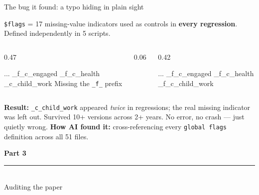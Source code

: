 \documentclass[aspectratio=169, 10pt]{beamer}
\begin{document}
\begin{frame}[fragile]{The bug it found: a typo hiding in plain sight}
\vskip-2pt
\begin{tcolorbox}[keybox, title={\faBug\quad The \texttt{\$flags} variable list}, top=2pt, bottom=2pt]
\small
\texttt{\$flags} = 17 missing-value indicators used as controls in \textbf{every regression}. Defined independently in 5 scripts.
\end{tcolorbox}
\vskip3pt
\begin{columns}[T]
\begin{column}{0.47\textwidth}
\begin{tcolorbox}[colback=SoftCoral!8, colframe=SoftCoral, boxrule=0.5pt, arc=2pt, left=5pt, right=5pt, top=3pt, bottom=3pt]
\vskip3pt
{\ttfamily\small\color{DeepCharcoal}
... \_f\_c\_engaged \_f\_c\_health\\
\colorbox{SoftCoral!20}{\_c\_child\_work}}
\vskip2pt
{\scriptsize Missing the \texttt{\_f\_} prefix}
\end{tcolorbox}
\end{column}
\begin{column}{0.06\textwidth}
\centering\vskip0.8cm
{\large\color{UVMGold}\faArrowRight}
\end{column}
\begin{column}{0.42\textwidth}
\begin{tcolorbox}[colback=PaleSage, colframe=SlateTeal!50, boxrule=0.5pt, arc=2pt, left=5pt, right=5pt, top=3pt, bottom=3pt]
\vskip3pt
{\ttfamily\small\color{DeepCharcoal}
... \_f\_c\_engaged \_f\_c\_health\\
\colorbox{PaleSage!50}{\_f\_c\_child\_work}}
\end{tcolorbox}
\end{column}
\end{columns}
\vskip3pt
\begin{tcolorbox}[quotebox, top=2pt, bottom=2pt]
\scriptsize \textbf{Result:} \texttt{\_c\_child\_work} appeared \textit{twice} in regressions; the real missing indicator was left out. Survived 10+ versions across 2+ years. No error, no crash --- just quietly wrong.
\textbf{How AI found it:} cross-referencing every \texttt{global flags} definition across all 51 files.
\end{tcolorbox}
\end{frame}

{
\begin{frame}
\centering\vfill
{\fontsize{22}{28}\bfseries\selectfont\color{white} Part 3}\\[6pt]
{\color{UVMGold}\rule{5cm}{0.8pt}}\\[6pt]
{\normalsize\color{UVMGold} Auditing the paper}\\[4pt]
\vfill
\end{frame}
}
\end{document}
